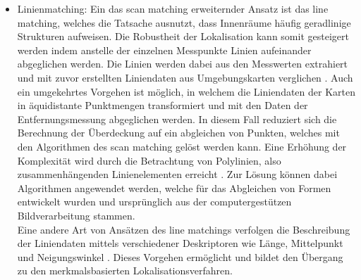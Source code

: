 \begin{itemize}
\item Linienmatching: Ein das scan matching erweiternder Ansatz ist das line matching, welches die Tatsache ausnutzt, dass Innenräume häufig geradlinige Strukturen aufweisen. Die Robustheit der Lokalisation kann somit gesteigert werden indem anstelle der einzelnen Messpunkte Linien aufeinander abgeglichen werden. Die Linien werden dabei aus den Messwerten extrahiert und mit zuvor erstellten Liniendaten aus Umgebungskarten verglichen \cite{Cox1991}\cite{Gutmann1999}. Auch ein umgekehrtes Vorgehen ist möglich, in welchem die Liniendaten der Karten in äquidistante Punktmengen transformiert und mit den Daten der Entfernungsmessung abgeglichen werden. In diesem Fall reduziert sich die Berechnung der Überdeckung auf ein abgleichen von Punkten, welches mit den Algorithmen des scan matching gelöst werden kann. Eine Erhöhung der Komplexität wird durch die Betrachtung von Polylinien, also zusammenhängenden Linienelementen erreicht \cite{Wolter2004}. Zur Lösung können dabei Algorithmen angewendet werden, welche für das Abgleichen von Formen entwickelt wurden und ursprünglich aus der computergestützen Bildverarbeitung stammen.\\
Eine andere Art von Ansätzen des line matchings verfolgen die Beschreibung der Liniendaten mittels verschiedener Deskriptoren wie Länge, Mittelpunkt und Neigungswinkel . Dieses Vorgehen ermöglicht \red[XXX] und bildet den Übergang zu den merkmalsbasierten Lokalisationsverfahren.


\end{itemize}

